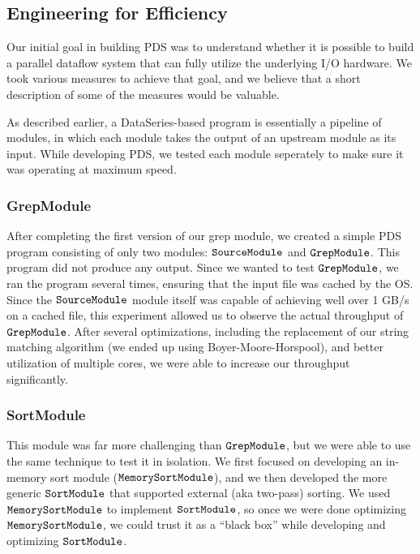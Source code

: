 \documentclass{acm_proc_article-sp}
\begin{document}
\subsection{Engineering for Efficiency}

Our initial goal in building PDS was to understand whether it is possible to
build a parallel dataflow system that can fully utilize the underlying I/O
hardware. We took various measures to achieve that goal, and we believe that a
short description of some of the measures would be valuable.

As described earlier, a DataSeries-based program is essentially a pipeline of
modules, in which each module takes the output of an upstream module as its
input. While developing PDS, we tested each module seperately to make sure it
was operating at maximum speed.

\subsubsection{GrepModule}

After completing the first version of our grep
  module, we created a simple PDS program consisting of only two modules: $\tt
  SourceModule$ and $\tt GrepModule$. This program did not produce any output.
  Since we wanted to test $\tt GrepModule$, we ran the program several times,
  ensuring that the input file was cached by the OS. Since the $\tt
  SourceModule$ module itself was capable of achieving well over 1 GB/s on a
  cached file, this experiment allowed us to observe the actual throughput of
  $\tt GrepModule$. After several optimizations, including the replacement of
  our string matching algorithm (we ended up using Boyer-Moore-Horspool), and
  better utilization of multiple cores, we were able to increase our throughput
  significantly.
  
\subsubsection{SortModule}

This module was far more challenging than $\tt
  GrepModule$, but we were able to use the same technique to test it in
  isolation. We first focused on developing an in-memory sort module ($\tt
  MemorySortModule$), and we then developed the more generic $\tt SortModule$
  that supported external (aka two-pass) sorting. We used $\tt MemorySortModule$
  to implement $\tt SortModule$, so once we were done optimizing $\tt
  MemorySortModule$, we could trust it as a ``black box'' while developing and
  optimizing $\tt SortModule$.
  
\end{document}
